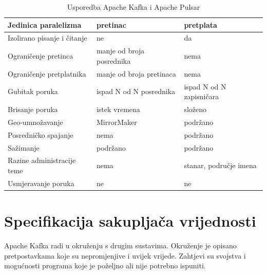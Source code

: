 \documentclass[utf8, diplomski, lmodern, numeric]{fer}
\begin{document}
\begin{table}[H]
\begin{adjustwidth}{-15mm}{15mm}
\begin{tabular}{|l|l|l|}
Jedinica paralelizma        & pretinac                      & pretplata                                      \\ \hline
Izolirano pisanje i čitanje & ne                            & da                                             \\ \hline
Ograničenje pretinca        & manje od broja posrednika     & nema                                           \\ \hline
Ograničenje pretplatnika    & manje od broja pretinaca      & nema                                           \\ \hline
Gubitak poruka              & ispad N od N posrednika       & ispad N od N zapisničara                       \\ \hline
Brisanje poruka             & istek vremena                 & složeno                                        \\ \hline
Geo-umnožavanje             & MirrorMaker                   & podržano                                       \\ \hline
Posredničko spajanje        & nema                          & podržano                                       \\ \hline
Sažimanje                   & podržano                      & podržano                                       \\ \hline
Razine administracije teme  & nema                          & stanar, područje imena                         \\ \hline
Usmjeravanje poruka         & ne                            & ne                                             \\ \hline
\end{tabular}

\end{adjustwidth}
 
\caption{Usporedba Apache Kafka i Apache Pulsar}
\label{table:kafka_pulsar}

\end{table}



\chapter{Specifikacija sakupljača vrijednosti}

Apache Kafka radi u okruženju s drugim sustavima. Okruženje je opisano pretpostavkama koje su nepromjenjive i uvijek vrijede. Zahtjevi su svojstva i mogućnosti programa koje je poželjno ali nije potrebno ispuniti.
\end{document}
